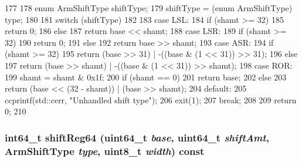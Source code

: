 \begin{DoxyCode}
177 {
178     enum ArmShiftType shiftType;
179     shiftType = (enum ArmShiftType) type;
180 
181     switch (shiftType)
182     {
183       case LSL:
184         if (shamt >= 32)
185             return 0;
186         else
187             return base << shamt;
188       case LSR:
189         if (shamt >= 32)
190             return 0;
191         else
192             return base >> shamt;
193       case ASR:
194         if (shamt >= 32)
195             return (base >> 31) | -((base & (1 << 31)) >> 31);
196         else
197             return (base >> shamt) | -((base & (1 << 31)) >> shamt);
198       case ROR:
199         shamt = shamt & 0x1f;
200         if (shamt == 0)
201             return base;
202         else
203             return (base << (32 - shamt)) | (base >> shamt);
204       default:
205         ccprintf(std::cerr, "Unhandled shift type\n");
206         exit(1);
207         break;
208     }
209     return 0;
210 }
\end{DoxyCode}
\hypertarget{classArmISA_1_1ArmStaticInst_ab15bd99705b24d9b8d647aba628ee562}{
\subsubsection[{shiftReg64}]{\setlength{\rightskip}{0pt plus 5cm}int64\_\-t shiftReg64 (uint64\_\-t {\em base}, \/  uint64\_\-t {\em shiftAmt}, \/  {\bf ArmShiftType} {\em type}, \/  uint8\_\-t {\em width}) const}}
\label{classArmISA_1_1ArmStaticInst_ab15bd99705b24d9b8d647aba628ee562}



